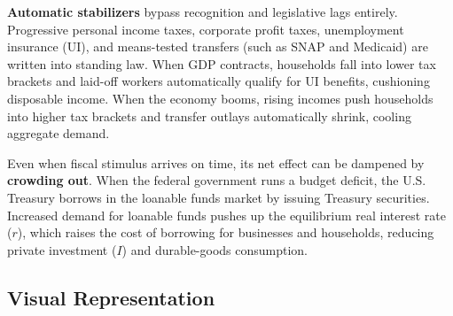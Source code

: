 \documentclass[11pt,letterpaper]{article}
\begin{document}
\textbf{Automatic stabilizers} bypass recognition and legislative lags entirely. Progressive personal income taxes, corporate profit taxes, unemployment insurance (UI), and means-tested transfers (such as SNAP and Medicaid) are written into standing law. When GDP contracts, households fall into lower tax brackets and laid-off workers automatically qualify for UI benefits, cushioning disposable income. When the economy booms, rising incomes push households into higher tax brackets and transfer outlays automatically shrink, cooling aggregate demand.

Even when fiscal stimulus arrives on time, its net effect can be dampened by \textbf{crowding out}. When the federal government runs a budget deficit, the U.S. Treasury borrows in the loanable funds market by issuing Treasury securities. Increased demand for loanable funds pushes up the equilibrium real interest rate ($r$), which raises the cost of borrowing for businesses and households, reducing private investment ($I$) and durable-goods consumption.

\subsection*{Visual Representation}
\end{document}
